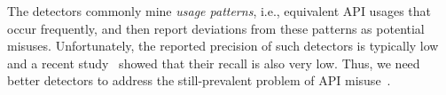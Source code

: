 The detectors commonly mine \emph{usage patterns}, i.e., equivalent API usages that occur frequently, and then report deviations from these patterns as potential misuses.
%
Unfortunately, the reported precision of such detectors is typically low and a recent study~\cite{ANNN+17} showed that their recall is also very low. 
Thus, we need better detectors to address the still-prevalent problem of API misuse~\cite{LHXRM16,ABFKMS16}.



%
%
